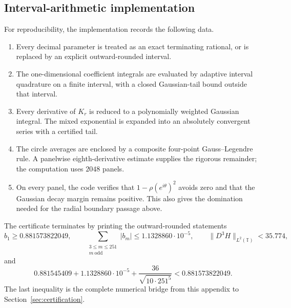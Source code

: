 \subsection{Interval-arithmetic implementation}
\label{app:certification-implementation}

For reproducibility, the implementation records the following data.

\begin{enumerate}
  \item Every decimal parameter is treated as an exact terminating rational,
  or is replaced by an explicit outward-rounded interval.
  \item The one-dimensional coefficient integrals are evaluated by adaptive
  interval quadrature on a finite interval, with a closed Gaussian-tail bound
  outside that interval.
  \item Every derivative of $K_r$ is reduced to a polynomially weighted
  Gaussian integral.  The mixed exponential is expanded into an absolutely
  convergent series with a certified tail.
  \item The circle averages are enclosed by a composite four-point
  Gauss--Legendre rule.  A panelwise eighth-derivative estimate supplies the
  rigorous remainder; the computation uses $2048$ panels.
  \item On every panel, the code verifies that $1-\rho(e^{i\theta})^2$ avoids
  zero and that the Gaussian decay margin remains positive.  This also gives
  the domination needed for the radial boundary passage above.
\end{enumerate}

The certificate terminates by printing the outward-rounded statements
\[
  b_1\ge0.881573822049,
  \qquad
  \sum_{\substack{3\le m\le251\\m\ \mathrm{odd}}}|b_m|
  \le1.1328860\cdot10^{-5},
  \qquad
  \|D^3H\|_{L^2(\mathbb T)}<35.774,
\]
and
\[
  0.881545409+1.1328860\cdot10^{-5}
  +\frac{36}{\sqrt{10\cdot251^5}}
  <0.881573822049.
\]
The last inequality is the complete numerical bridge from this appendix to
Section~\ref{sec:certification}.
